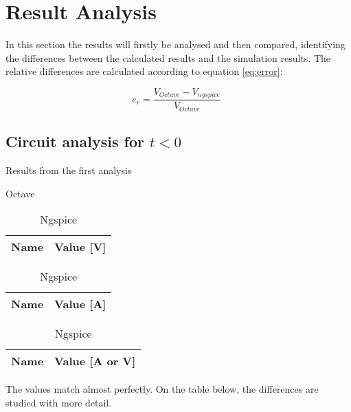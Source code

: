 \section{Result Analysis}
\label{sec:ResultAnalysis}

\indent

In this section the results will firstly be analysed and then compared, identifying the differences between the calculated results and the simulation results. The relative differences are calculated according to equation \ref{eq:error}:

\begin{equation}
    e_r = \frac{V_{Octave}-V_{ngspice}}{V_{Octave}} \hspace{5pt}
    \label{eq:error}
\end{equation}

\subsection{Circuit analysis for $t<0$}


\begin{table}[H]
    \caption{Results from the first analysis}
    \begin{subtable}{.5\linewidth}
      \centering
        \caption{Octave}
        \begin{tabular}{ll}
        \hline    
        {\bf Name} & {\bf Value [V]} \\ \hline
        
        \end{tabular}
        \begin{tabular}{ll}
        \hline    
        {\bf Name} & {\bf Value [A]} \\ \hline
        
        \end{tabular}
        \label{tab:OpVOc}
    \end{subtable}%
    \begin{subtable}{.5\linewidth}
      \centering
        \caption{Ngspice}
        \begin{tabular}{ll}
        \hline    
        {\bf Name} & {\bf Value [A or V]} \\ \hline
        
        \end{tabular}
        \label{tab:OpNgs}
    \end{subtable} 
    \label{tab:Op}
\end{table}

The values match almost perfectly. On the table below, the differences are studied with more detail.

